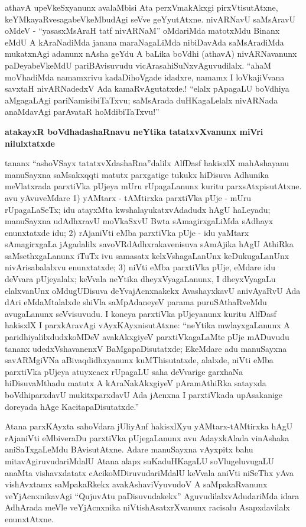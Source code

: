 athavA upeVkeSxyanunx avalaMbisi Ata perxVmakAkxgi pirxVtisutAtxne, keYMkayaRvesagabeVkeMbudAgi seVve geYyutAtxne. nivARNavU saMsAravU oMdeV - ``yasasxMsAraH tatf \hbox{nivARNaM}'' oMdariMda matotxMdu Binanx eMdU A kAraNadiMda janana maraNagaLiMda nibiDavAda saMsAradiMda mukatxnAgi adanunx nAsha geYdu A baLika boVdhi (athavA) nivARNavanunx paDeyabeVkeMdU pariBAvisuvudu vicArasahiSuNxvAguvudilalx. ``ahaM moVhadiMda namamxrivu kadaDihoVgade idadxre, namamx I loVkajiVvana savxtaH nivARNadedxV Ada kamaR\-vAgutatxde.! ``elalx pApagaLU boVdhiya aMgagaLAgi pariNamisibiTaTxvu; saMsArada duHKagaLelalx nivARNada anaMdavAgi parAvataR hoMdibiTaTxvu!''

\smallskip
\begin{center}
{\Large\bf atakayxR boVdhadashaRnavu neYtika tatatxvXvanunx miVri nilulxtatxde}
\end{center}

tananx ``ashoVSayx tatatxvXdashaRna''dalilx AlfDasf hakisxlX mahAshayanu manuSayxna saMsakxqqti matutx parxgatige tukukx hiDisuva Adhunika meVlatxrada parxtiVka pUjeya mUru rUpagaLanunx kuritu parxsAtxpisutAtxne. avu yAvuveMdare {\rm 1)} yAMtarx - tAMtirxka parxtiVka pUje - mUru rUpagaLaSeTx; idu atayxMta kwshalayukatxvAdadudx hAgU haLeyadu; manuSayxna udAdhxravU moVkaSxvU Bwta sAmagirxgaLiMda sAdhayx enunxtatxde idu; {\rm 2)} rAjaniVti eMba parxtiVka pUje - idu yaMtarx sAmagirxgaLa jAgadalilx savoVRdAdhxrakavenisuva sAmAjika hAgU AthiRka saMsethxgaLanunx iTuTx ivu samasatx kelxVshagaLanUnx keDukugaLanUnx nivArisabalalxvu enunxtatxde; {\rm 3)} niVti eMba parxtiVka pUje, eMdare idu deVvara pUjeyalalx; keVvala neYtika dheyxVyagaLanunx, I dheyxVyagaLu elalxvanUnx oMdugUDisuva deYvajAcnxnakekx AvashayxkavU anivAyaRvU Ada dAri eMdaMtalalxde shiVla saMpAdaneyeV parama puruSAthaRveMdu avugaLanunx seVvisuvudu. I koneya parxtiVka pUjeyanunx kuritu AlfDasf hakisxlX I parxkAravAgi vAyxKAyxnisutAtxne: ``neYtika mwlayxgaLanunx A paridhiyalilxdudxkoMDeV avakAkxgiyeV parxtiVkagaLaMte pUje mADuvudu tananx udedxVshavanenxV BaMgapaDisutatxde; EkeMdare adu manuSayxna savARMgiVNa aBivaqdidhxyanunx kuMThisutatxde, alalxde, niVti eMba parxtiVka pUjeya atuyxcacx rUpagaLU saha deVvarige garxhaNa hiDisuvaMthadu matutx A kAraNakAkxgiyeV pAramAthiRka satayxda boVdhiparxdavU mukitxparxdavU Ada jAcnxna I parxtiVkada upAsakanige doreyada hAge KacitapaDisutatxde.''

Atana parxKAyxta sahoVdara jUliyAnf hakisxlXyu yAMtarx-tAMtirxka hAgU rAjaniVti eMbiveraDu parxtiVka pUjegaLanunx avu AdayxkAlada vinAshaka aniSaTxgaLeMdu BAvisutAtxne. Adare manuSayxna vAyxpitx bahu mitavAgiruvudariMdalU Atana alapx suKaduHKagaLU soVlugeluvugaLU anaMta vishavxdatatx cAcikoMDiruvudariMdalU keVvala aniVti niSeThx yAva vishAvxtamx saMpakaRkekx avakAshaviVyuvudoV A saMpakaRvanunx veYjAcnxnikavAgi ``QujuvAtu paDisuvudakekx'' AguvudilalxvAdudariMda idara AdhArada meVle veYjAcnxnika niVtishAsatxrXvanunx racisalu Asapxdavilalx enunxtAtxne.

